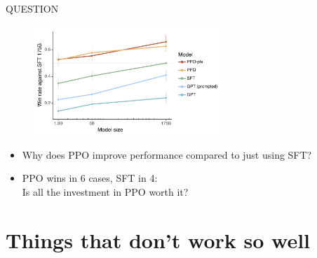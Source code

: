 \begin{vbframe}{QUESTION}

\vfill

\begin{figure}
\centering
\includegraphics[width = 7cm]{figure/mainresult.png}
\end{figure}

\begin{itemize}
        \item Why does PPO improve performance compared to
        just using SFT?
        \item PPO wins in 6 cases, SFT in 4:\\ Is all the
        investment in PPO worth it?
\end{itemize}

\vfill

\end{vbframe}





\section{Things that don't work so well}











